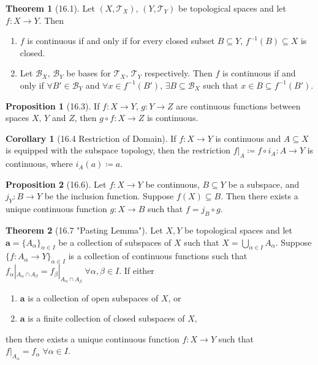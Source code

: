 \documentclass{article}
\newcommand{\B}{\ensuremath{\mathcal{B}}}
\newcommand{\Iff}{if and only if}
\newcommand{\coleq}{\ensuremath{\coloneqq}}
\newcommand{\func}[3]{\ensuremath{#1: #2 \to #3}}
\newcommand{\tp}{\ensuremath{\mathscr{T}}}
\newcommand{\Ts}[2]{\ensuremath{(#1,#2)}}
\newcommand{\Union}{\bigcup}
\newcommand{\inter}{\cap}
\renewcommand{\Subset}{\subseteq}
\theoremstyle{definition}
\newtheorem*{cor}{Corollary}
\newtheorem*{thm}{Theorem}
\newtheorem*{prop}{Proposition}
\theoremstyle{remark}
\begin{document}
{        \begin{thm}[16.1]
            Let $\Ts{X}{\tp_X}, \, \Ts{Y}{\tp_Y}$ be topological spaces and let $\func{f}{X}{Y}$. Then
            \begin{enumerate}
                \item $f$ is continuous \Iff{} for every closed subset $B \Subset Y$, $f^{-1}(B) \Subset X$ is closed.
                \item Let $\B_X, \, \B_Y$ be bases for $\tp_X, \, \tp_Y$ respectively. Then $f$ is continuous \Iff{} $\forall B' \in \B_Y$ and $\forall x \in f^{-1}(B')$, $\exists B \Subset \B_X$ such that $x \in B \Subset f^{-1}(B')$.
            \end{enumerate}
        \end{thm}
        
        \begin{prop}[16.3]
            If $\func{f}{X}{Y}, \, \func{g}{Y}{Z}$ are continuous functions between spaces $X, \, Y$ and $Z$, then $\func{g \circ f}{X}{Z}$ is continuous.
        \end{prop}
        
        \begin{cor}[16.4 Restriction of Domain]
            If $\func{f}{X}{Y}$ is continuous and $A \Subset X$ is equipped with the subspace topology, then the restriction $f|_A \coleq \func{f\circ i_A}{A}{Y}$ is continuous, where $i_A(a) \coleq a$.
        \end{cor}
        
        \begin{prop}[16.6]
            Let $\func{f}{X}{Y}$ be continuous, $B \Subset Y$ be a subspace, and $\func{j_Y}{B}{Y}$ be the inclusion function. Suppose $f(X) \Subset B$. Then there exists a unique continuous function $\func{g}{X}{B}$ such that $f=j_B\circ g$.
        \end{prop}
        
        \begin{thm}[16.7 "Pasting Lemma"]
                Let $X,Y$ be topological spaces and let $\mathbf{a}=\{A_\alpha\}_{\alpha \in I}$ be a collection of subspaces of $X$ such that $X=\Union\limits_{\alpha\in I} A_\alpha$. Suppose $\{\func{f}{A_\alpha}{Y}\}_{\alpha \in I}$ is a collection of continuous functions such that $f_\alpha|_{A_\alpha \inter A_\beta} = f_\beta|_{A_\alpha \inter A_\beta} \; \forall \alpha,\beta \in I$. If either
                \begin{enumerate}
                    \item $\mathbf{a}$ is a collection of open subspaces of $X$, or
                    \item $\mathbf{a}$ is a finite collection of closed subspaces of $X$,
                \end{enumerate}
                then there exists a unique continuous function $\func{f}{X}{Y}$ such that $f|_{A_\alpha}=f_\alpha \; \forall \alpha\in I$.
        \end{thm}
        
}
\end{document}
